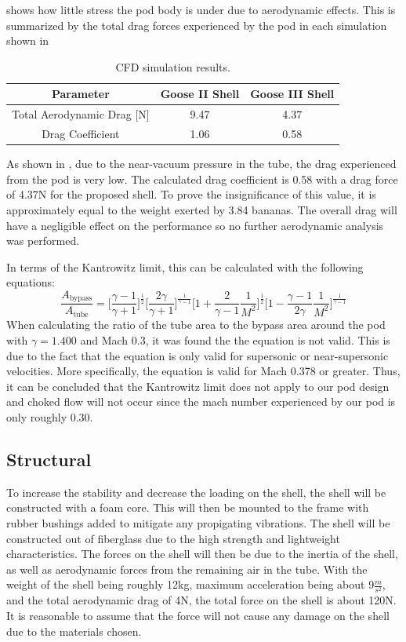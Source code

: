 \documentclass[main.tex]{subfiles}
\begin{document}
 shows how little stress the pod body is under due to aerodynamic effects. This is summarized by the total drag forces experienced by the pod in each simulation shown in 
\begin{table}[h!]
\centering
\begin{tabular}{c c c} 
\hline
Parameter & Goose II Shell & Goose III Shell \\
\hline
Total Aerodynamic Drag [N] & 9.47 & 4.37\\
Drag Coefficient & 1.06 & 0.58\\
\hline
\end{tabular}
\caption{CFD simulation results.}
\label{table:aerotable2}
\end{table}
As shown in , due to the near-vacuum pressure in the tube, the drag experienced from the pod is very low. The calculated drag coefficient is 0.58 with a drag force of 4.37N for the proposed shell. To prove the insignificance of this value, it is approximately equal to the weight exerted by 3.84 bananas. The overall drag will have a negligible effect on the performance so no further aerodynamic analysis was performed.

In terms of the Kantrowitz limit, this can be calculated with the following equations:
\begin{equation}
\frac{A_{\textrm{bypass}}}{A_{\textrm{tube}}}=\bigg[\frac{\gamma - 1}{\gamma + 1}\bigg]^{\frac{1}{2}}\bigg[\frac{2\gamma}{\gamma + 1}\bigg]^{\frac{1}{\gamma - 1}}\bigg[1 + \frac{2}{\gamma - 1}\frac{1}{M^{2}}\bigg]^{\frac{1}{2}}\bigg[1 - \frac{\gamma - 1}{2\gamma}\frac{1}{M^{2}}\bigg]^{\frac{1}{\gamma - 1}}
\end{equation}
When calculating the ratio of the tube area to the bypass area around the pod with $\gamma= 1.400$ and Mach 0.3, it was found the the equation is not valid. This is due to the fact that the equation is only valid for supersonic or near-supersonic velocities. More specifically, the equation is valid for Mach 0.378 or greater. Thus, it can be concluded that the Kantrowitz limit does not apply to our pod design and choked flow will not occur since the mach number experienced by our pod is only roughly 0.30.\\
    \subsection{Structural}
To increase the stability and decrease the loading on the shell, the shell will be constructed with a foam core. This will then be mounted to the frame with rubber bushings added to mitigate any propigating vibrations. The shell will be constructed out of fiberglass due to the high strength and lightweight characteristics. The forces on the shell will then be due to the inertia of the shell, as well as aerodynamic forces from the remaining air in the tube. With the weight of the shell being roughly 12kg, maximum acceleration being about 9$\frac{m}{s^{2}}$, and the total aerodynamic drag of 4N, the total force on the shell is about 120N. It is reasonable to assume that the force will not cause any damage on the shell due to the materials chosen. 
\end{document}
